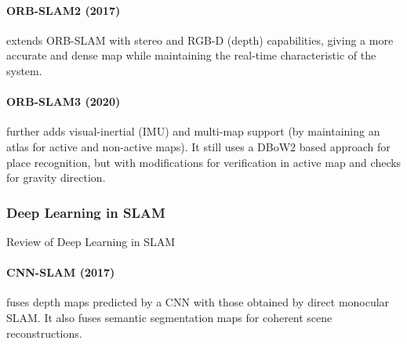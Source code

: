 \paragraph{ORB-SLAM2 (2017) \cite{MurArtal2016ORBSLAM2AO}} extends
ORB-SLAM with stereo and RGB-D (depth) capabilities, giving a more
accurate and dense map while maintaining the real-time characteristic
of the system. 

\paragraph{ORB-SLAM3 (2020) \cite{Campos2020ORBSLAM3AA}} further adds
visual-inertial (IMU) and multi-map support (by maintaining an atlas
for active and non-active maps). It still uses a DBoW2 based approach
for place recognition, but with modifications for verification in
active map and checks for gravity direction.

\subsubsection{Deep Learning in SLAM}

Review of Deep Learning in SLAM

\paragraph{CNN-SLAM (2017) \cite{Tateno2017CNNSLAMRD}} fuses depth
maps predicted by a CNN with those obtained by direct monocular SLAM.
It also fuses semantic segmentation maps for coherent scene
reconstructions.




